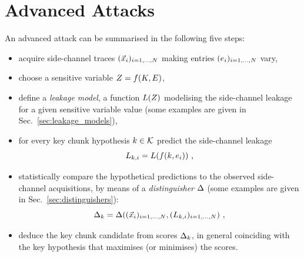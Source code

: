 \section{Advanced Attacks}\label{sec:advanced}
An advanced attack can be summarised in the following five steps: 
\begin{itemize}
\item acquire side-channel traces $(\vec{x}_i)_{i=1,\dots , N}$ making entries $(e_i)_{i=1,\dots,N}$ vary,
\item choose a sensitive variable $Z = f(K,E)$, 
\item define a \emph{leakage model}, \ie a function $L(Z)$ modelising the side-channel leakage for a given sensitive variable value (some examples are given in Sec.~\ref{sec:leakage_models}),
\item for every key chunk hypothesis $k \in \mathcal{K}$ predict the side-channel leakage 
\begin{equation}\label{eq:predictions}
L_{k,i} = L(f(k,e_i)) \mbox{ ,}
\end{equation}
\item statistically compare the hypothetical predictions to the observed side-channel acquisitions, by means of a  \emph{distinguisher} $\Delta$ (some examples are given in Sec.~\ref{sec:distinguishers}):
\begin{equation}
\Delta_{k} = \Delta((\vec{x}_i)_{i=1,\dots , N}, (L_{k,i} )_{i=1,\dots , N}) \mbox{ ,}
\end{equation}
\item deduce the key chunk candidate from scores $\Delta_{k}$, in general coinciding with the key hypothesis that maximises (or minimises) the scores.
\end{itemize}

